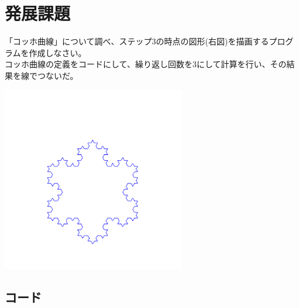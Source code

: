 \documentclass{scrartcl}
\begin{document}
\newpage

\section{発展課題}
\label{sec:orgb2caf4d}
「コッホ曲線」について調べ、ステップ3の時点の図形(右図)を描画するプログラムを作成しなさい。\\
コッホ曲線の定義をコードにして、繰り返し回数を3にして計算を行い、その結果を線でつないだ。\\

\begin{center}
\includegraphics[width=8cm]{./2017-10-03-06.png}
\end{center}

\subsection{コード}
\label{sec:orge2d7612}
\end{document}
